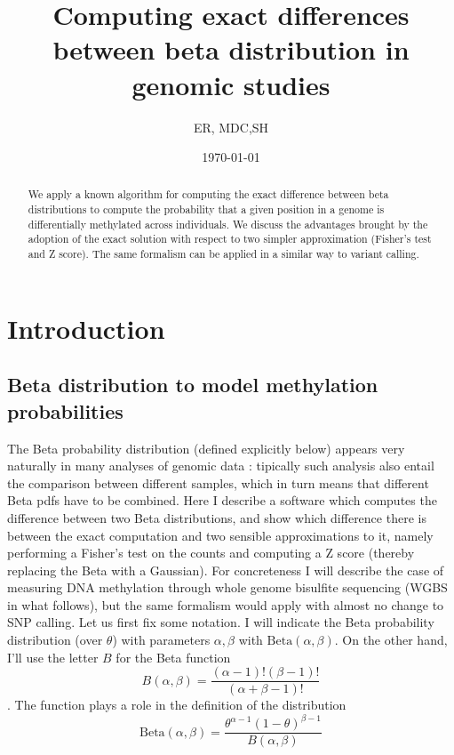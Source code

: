 \documentclass[11pt]{amsart}
\title{Computing exact differences between beta distribution in genomic studies}
\author{ER, MDC,SH}
\date{\today}
\begin{document}
\begin{abstract}
We apply a known algorithm for computing the exact difference between beta distributions
to compute the probability that a given position in a genome is differentially methylated across
individuals. We discuss the advantages brought by the adoption of the exact solution
with respect to two simpler approximation (Fisher's test and Z score).
The same formalism can be applied in a similar way to variant calling.
\end{abstract}
\maketitle
\section{Introduction}
\subsection{Beta distribution to model methylation probabilities}
The Beta probability distribution (defined explicitly below)  appears very naturally in many analyses of genomic data : tipically such analysis also entail the comparison between different samples, which in turn means that different Beta pdfs have to be combined. Here I describe a software which computes the difference between two Beta distributions, and show which difference there is between the exact computation and two sensible approximations to it, namely performing a Fisher's test on the counts and computing a Z score (thereby replacing the Beta with a Gaussian). For concreteness I will describe the case of measuring DNA methylation through whole genome bisulfite sequencing (WGBS in what follows), but the same formalism would apply with almost no change to SNP calling. Let us first fix some notation. I will indicate the Beta probability distribution (over $\theta$) with parameters $\alpha,\beta$ with $\mbox{Beta}(\alpha,\beta)$. On the other hand, I'll use the letter $B$ for the Beta function 
\[B(\alpha,\beta)=\frac{(\alpha-1)!(\beta-1)!}{(\alpha+\beta-1)!}\]. The function plays a role in the definition of the distribution \[\mbox{Beta}(\alpha,\beta)=\frac{\theta^{\alpha-1}(1-\theta)^{\beta-1}}{B(\alpha,\beta)}\]
 
\end{document}
